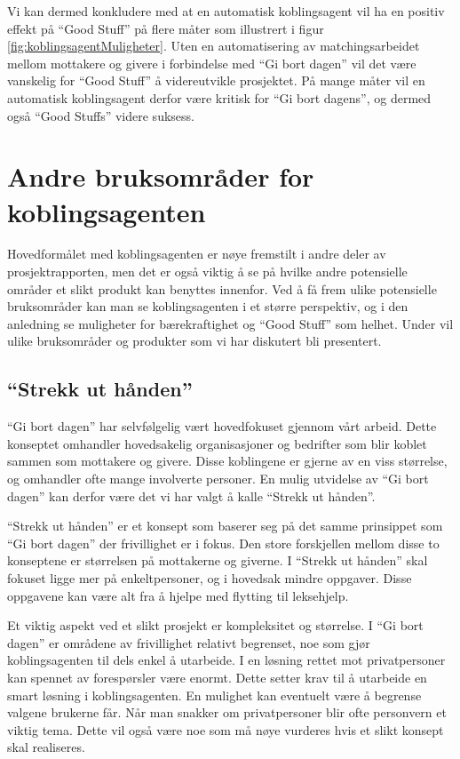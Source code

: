 Vi kan dermed konkludere med at en automatisk koblingsagent vil ha en positiv effekt på ``Good Stuff'' på flere måter som illustrert i figur \ref{fig:koblingsagentMuligheter}. Uten en automatisering av matchingsarbeidet mellom mottakere og givere i forbindelse med ``Gi bort dagen'' vil det være vanskelig for ``Good Stuff'' å videreutvikle prosjektet. På mange måter vil en automatisk koblingsagent derfor være kritisk for ``Gi bort dagens'', og dermed også ``Good Stuffs'' videre suksess.

\section{Andre bruksområder for koblingsagenten }
\label{sec:andrebruksomrader}
Hovedformålet med koblingsagenten er nøye fremstilt i andre deler av prosjektrapporten, men det er også viktig å se på hvilke andre potensielle områder et slikt produkt kan benyttes innenfor. Ved å få frem ulike potensielle bruksområder kan man se koblingsagenten i et større perspektiv, og i den anledning se muligheter for bærekraftighet og ``Good Stuff'' som helhet. Under vil ulike bruksområder og produkter som vi har diskutert bli presentert.

\subsection{“Strekk ut hånden”}
\label{sec:strekkuthanden}
``Gi bort dagen'' har selvfølgelig vært hovedfokuset gjennom vårt arbeid. Dette konseptet omhandler hovedsakelig organisasjoner og bedrifter som blir koblet sammen som mottakere og givere. Disse koblingene er gjerne av en viss størrelse, og omhandler ofte mange involverte personer. En mulig utvidelse av ``Gi bort dagen'' kan derfor være det vi har valgt å kalle ``Strekk ut hånden''.

``Strekk ut hånden'' er et konsept som baserer seg på det samme prinsippet som ``Gi bort dagen'' der frivillighet er i fokus. Den store forskjellen mellom disse to konseptene er størrelsen på mottakerne og giverne. I ``Strekk ut hånden'' skal fokuset ligge mer på enkeltpersoner, og i hovedsak mindre oppgaver. Disse oppgavene kan være alt fra å hjelpe med flytting til leksehjelp.

Et viktig aspekt ved et slikt prosjekt er kompleksitet og størrelse. I ``Gi bort dagen'' er områdene av frivillighet relativt begrenset, noe som gjør koblingsagenten til dels enkel å utarbeide. I en løsning rettet mot privatpersoner kan spennet av forespørsler være enormt. Dette setter krav til å utarbeide en smart løsning i koblingsagenten. En mulighet kan eventuelt være å begrense valgene brukerne får. Når man snakker om privatpersoner blir ofte personvern et viktig tema. Dette vil også være noe som må nøye vurderes hvis et slikt konsept skal realiseres.

